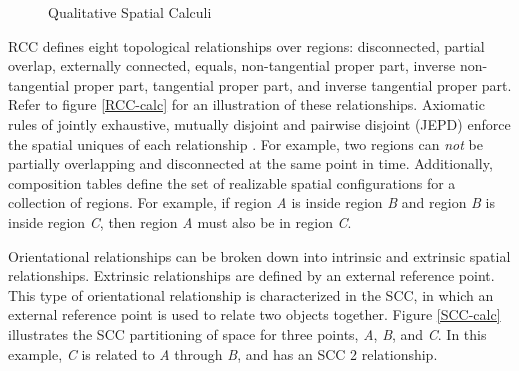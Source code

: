\documentclass[12pt]{ucthesis}
\begin{document}
\begin{figure}[t]
 \centering
 \hspace{7 mm}
  \hspace{7 mm}
 \caption{Qualitative Spatial Calculi}
\label{Qualitative Spatial Calculi}
\end{figure}

RCC defines eight topological relationships over regions: disconnected, partial overlap, externally connected, equals, non-tangential proper part, inverse non-tangential proper part, tangential proper part, and inverse tangential proper part. Refer to figure \ref{RCC-calc} for an illustration of these relationships. Axiomatic rules of jointly exhaustive, mutually disjoint and pairwise disjoint (JEPD) enforce the spatial uniques of each relationship \cite{Randell92aspatial}. For example, two regions can \emph{not} be partially overlapping and disconnected at the same point in time. Additionally, composition tables define the set of realizable spatial configurations for a collection of regions. For example, if region \emph{A} is inside region \emph{B} and region \emph{B} is inside region \emph{C}, then region \emph{A} must also be in region \emph{C}.

Orientational relationships can be broken down into intrinsic and extrinsic spatial relationships. Extrinsic relationships are defined by  an external reference point. This type of orientational relationship is characterized in the SCC, in which an external reference point is used to relate two objects together. Figure \ref{SCC-calc} illustrates the SCC partitioning of space for three points, \emph{A}, \emph{B}, and \emph{C}. In this example, \emph{C} is related to \emph{A} through \emph{B}, and has an SCC 2 relationship. 
\end{document}
